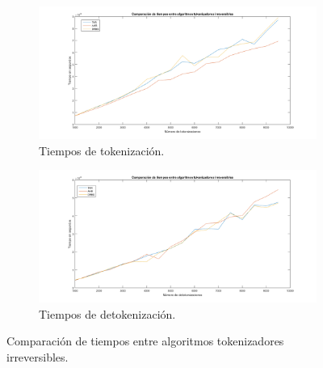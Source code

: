 \begin{figure}
  \centering
  \begin{subfigure}{1\textwidth}
    \begin{center}
      \includegraphics[width=1\linewidth]{diagramas/tok_irrev}
      \caption{Tiempos de tokenización.}
    \end{center}
  \end{subfigure}
  \begin{subfigure}{0.9\textwidth}
    \begin{center}
      \includegraphics[width=1\linewidth]{diagramas/detok_irrev}
      \caption{Tiempos de detokenización.}
    \end{center}
  \end{subfigure}
  \caption{Comparación de tiempos entre algoritmos tokenizadores irreversibles.}
  \label{figura:tok_irrev}
\end{figure}

